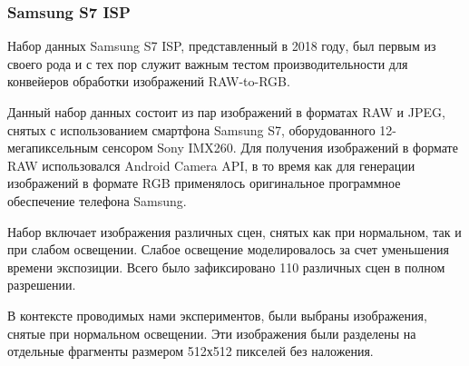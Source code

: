 \subsubsection{Samsung S7 ISP}

Набор данных Samsung S7 ISP, представленный в 2018 году, был первым из своего рода и с тех пор служит важным тестом производительности для конвейеров обработки изображений RAW-to-RGB.

Данный набор данных состоит из пар изображений в форматах RAW и JPEG, снятых с использованием смартфона Samsung S7, оборудованного 12-мегапиксельным сенсором Sony IMX260. Для получения изображений в формате RAW использовался Android Camera API, в то время как для генерации изображений в формате RGB применялось оригинальное программное обеспечение телефона Samsung.

Набор включает изображения различных сцен, снятых как при нормальном, так и при слабом освещении. Слабое освещение моделировалось за счет уменьшения времени экспозиции. Всего было зафиксировано 110 различных сцен в полном разрешении.

В контексте проводимых нами экспериментов, были выбраны изображения, снятые при нормальном освещении. Эти изображения были разделены на отдельные фрагменты размером 512х512 пикселей без наложения.